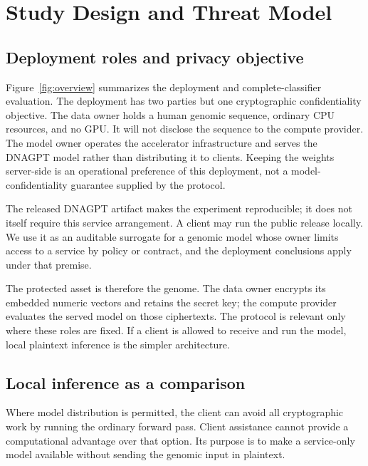 
\section{Study Design and Threat Model}
\label{sec:threat-model}

\subsection{Deployment roles and privacy objective}
Figure~\ref{fig:overview} summarizes the deployment and complete-classifier evaluation.
The deployment has two parties but one cryptographic confidentiality objective. The data owner
holds a human genomic sequence, ordinary CPU resources, and no GPU. It will not disclose the
sequence to the compute provider. The model owner operates the accelerator infrastructure and
serves the DNAGPT model rather than distributing it to clients. Keeping the weights server-side is
an operational preference of this deployment, not a model-confidentiality guarantee supplied by
the protocol.

The released DNAGPT artifact makes the experiment reproducible; it does not itself require this
service arrangement. A client may run the public release locally. We use it as an auditable
surrogate for a genomic model whose owner limits access to a service by policy or contract, and the
deployment conclusions apply under that premise.

The protected asset is therefore the genome. The data owner encrypts its embedded numeric vectors
and retains the secret key; the compute provider evaluates the served model on those ciphertexts.
The protocol is relevant only where these roles are fixed. If a client is allowed to receive and
run the model, local plaintext inference is the simpler architecture.

\subsection{Local inference as a comparison}
Where model distribution is permitted, the client can avoid all cryptographic work by running the
ordinary forward pass. Client assistance cannot provide a computational advantage over that
option. Its purpose is to make a service-only model available without sending the genomic input in
plaintext.

